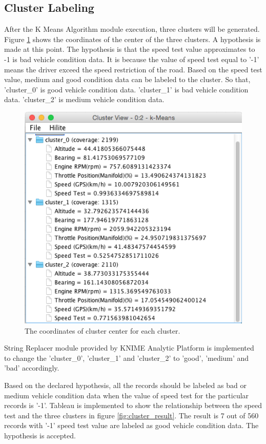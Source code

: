 \subsection{Cluster Labeling}
After the K Means Algorithm module execution, three clusters will be generated. Figure \ref{fig:cluster} shows the coordinates of the center of the three clusters. A hypothesis is made at this point. The hypothesis is that the speed test value approximates to -1 is bad vehicle condition data. It is because the value of speed test equal to '-1' means the driver exceed the speed restriction of the road. Based on the speed test value, medium and good condition data can be labeled to the cluster. So that, 'cluster\_0' is good vehicle condition data. 'cluster\_1' is bad vehicle condition data. 'cluster\_2' is medium vehicle condition data.

\begin{figure}[hbt!]\centering
\includegraphics[height=.5\textwidth]{image/cluster}
\caption{The coordinates of cluster center for each cluster.}
\label{fig:cluster}
\end{figure}


String Replacer module provided by KNIME Analytic Platform is implemented to change the 'cluster\_0', 'cluster\_1' and 'cluster\_2' to 'good', 'medium' and 'bad' accordingly.

Based on the declared hypothesis, all the records should be labeled as bad or medium vehicle condition data when the value of speed test for the particular records is '-1'. Tableau is implemented to show the relationship between the speed test and the three clusters in figure \ref{fig:cluster_result}. The result is 7 out of 560 records with '-1' speed test value are labeled as good vehicle condition data. The hypothesis is accepted.

